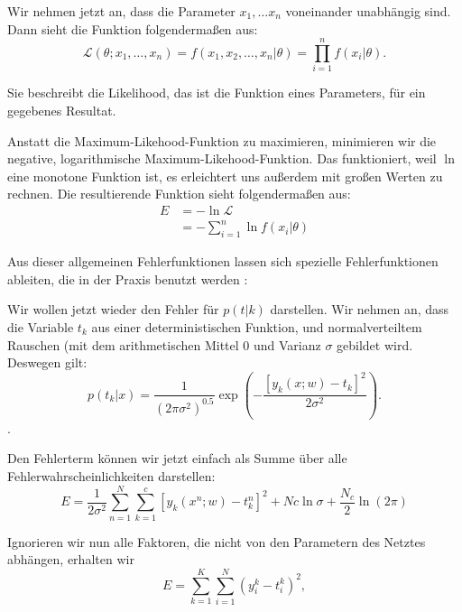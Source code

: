 Wir nehmen jetzt an, dass die Parameter $x_1, \ldots x_n$ voneinander unabhängig sind. Dann sieht die Funktion folgendermaßen aus:
\begin{equation}
  \mathcal{L} (\theta; x_1, \ldots, x_n) =
  f(x_1, x_2, \ldots, x_n | \theta) =
  \prod_{i = 1}^n f(x_i|\theta) .
\end{equation}

Sie beschreibt die Likelihood, das ist die Funktion eines Parameters, für ein gegebenes Resultat. %

Anstatt die Maximum-Likehood-Funktion zu maximieren, minimieren wir die negative, logarithmische Maximum-Likehood-Funktion. Das funktioniert, weil $\ln$ eine monotone Funktion ist, es erleichtert uns außerdem mit großen Werten zu rechnen. Die resultierende Funktion sieht folgendermaßen aus:
\begin{align}
 E  & = - \ln \mathcal{L} \\
  & = - \sum_{i=1}^n \ln f(x_i|\theta) 
\end{align}

Aus dieser allgemeinen Fehlerfunktionen lassen sich spezielle Fehlerfunktionen ableiten, die in der Praxis benutzt werden \cite{bishop1995neural}:

Wir wollen jetzt wieder den Fehler für $p(t|k)$ darstellen. Wir nehmen an, dass die Variable $t_k$ aus einer deterministischen Funktion, und normalverteiltem Rauschen (mit dem arithmetischen Mittel $0$ und Varianz $\sigma$ gebildet wird.  
Deswegen gilt: 
\begin{equation}
  p(t_k|x) = \frac{1}{(2 \pi \sigma^2)^{0.5}} \exp \left( -\frac{ \left[  y_k(x; w) - t_k \right]^2 }{2 \sigma^2} \right).
\end{equation}.

Den Fehlerterm können wir jetzt einfach als Summe über alle Fehlerwahrscheinlichkeiten darstellen:
\begin{equation}
  E = \frac{1}{2 \sigma^2} \sum_{n=1}^{N} \sum_{k=1}^{c} \left[ y_k(x^n; w) - t_k^n \right]^2 + Nc \ln \sigma + \frac{N_c}{2} \ln (2 \pi)
\end{equation}

Ignorieren wir nun alle Faktoren, die nicht von den Parametern des Netztes abhängen, erhalten wir 
\begin{equation}
\label{eq:MSE}
E = \sum_{k=1}^K \sum_{i=1}^N \left( y_i^k - t_i^k \right)^2,
\end{equation}

